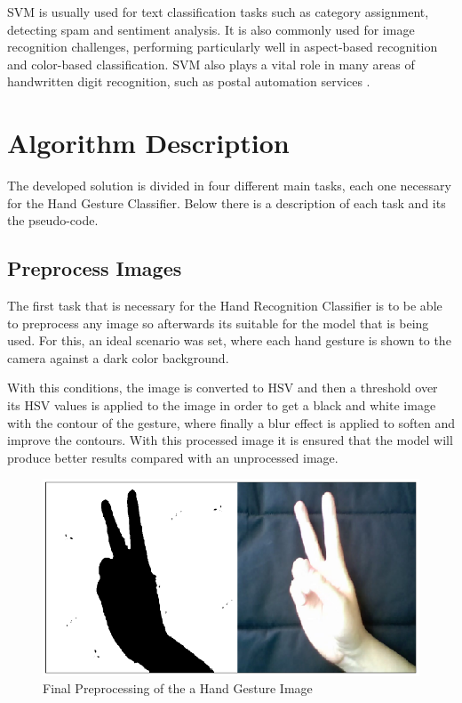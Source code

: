 \documentclass[a4paper,10pt,english]{article}
\begin{document}
        SVM is usually used for text classification tasks such as category assignment, detecting spam and sentiment analysis. It is also commonly used for image recognition challenges, performing particularly well in aspect-based recognition and color-based classification. SVM also plays a vital role in many areas of handwritten digit recognition, such as postal automation services \cite{SVM:Simple}.
        
        \vspace{20pt}
    \section{Algorithm Description}\label{sec:algorithms}
    
         The developed solution is divided in four different main tasks, each one necessary for the Hand Gesture Classifier. Below there is a description of each task and its the pseudo-code.
         
         
        \subsection{Preprocess Images}
        
        The first task that is necessary for the Hand Recognition Classifier is to be able to preprocess any image so afterwards its suitable for the model that is being used. For this, an ideal scenario was set, where each hand gesture is shown to the camera against a dark color background.
        
        With this conditions, the image is converted to HSV and then a threshold over its HSV values is applied to the image in order to get a black and white image with the contour of the gesture, where finally a blur effect is applied to soften and improve the contours. With this processed image it is ensured that the model will produce better results compared with an unprocessed image.
    
        \begin{figure}[h!]
            \centering
            \includegraphics[width=330pt]{images/processing}
            \caption{Final Preprocessing of the a Hand Gesture Image} \label{fig:processing}
        \end{figure}
    
\end{document}
